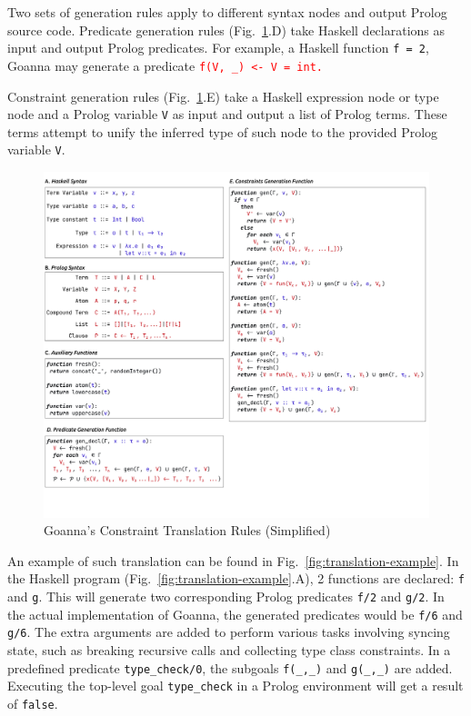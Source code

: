 \documentclass[pdflatex,sn-nature,Numbered]{sn-jnl}%
\begin{document}
    Two sets of generation rules apply to different syntax nodes and output Prolog source code. Predicate generation rules (Fig.~\ref{fig:translation}.D) take Haskell declarations as input and output Prolog predicates. For example, a Haskell function \texttt{f = 2}, Goanna may generate a predicate \texttt{\textcolor{red}{f(V, \_) <- V = int.}}
    
    Constraint generation rules (Fig.~\ref{fig:translation}.E) take a Haskell expression node or type node and a Prolog variable \texttt{V} as input and output a list of Prolog terms. These terms attempt to unify the inferred type of such node to the provided Prolog variable \texttt{V}.
    
    \begin{figure}[ht!]
        \centering
        \includegraphics[width=\linewidth,trim={0 6cm 0 0},clip]{images/Generation}
        \caption{Goanna's Constraint Translation Rules (Simplified)} 
        \label{fig:translation}
    \end{figure}
    
  
    An example of such translation can be found in Fig.~\ref{fig:translation-example}. In the Haskell program (Fig.~\ref{fig:translation-example}.A), 2 functions are declared: \texttt{f} and \texttt{g}. This will generate two corresponding Prolog predicates \texttt{f/2} and \texttt{g/2}. In the actual implementation of Goanna, the generated predicates would be \texttt{f/6} and \texttt{g/6}. The extra arguments are added to perform various tasks involving syncing state, such as breaking recursive calls and collecting type class constraints. In a predefined predicate \texttt{type\_check/0}, the subgoals \texttt{f(\_,\_)} and \texttt{g(\_,\_)} are added. Executing the top-level goal \texttt{type\_check} in a Prolog environment will get a result of \texttt{false}.
    
\end{document}
